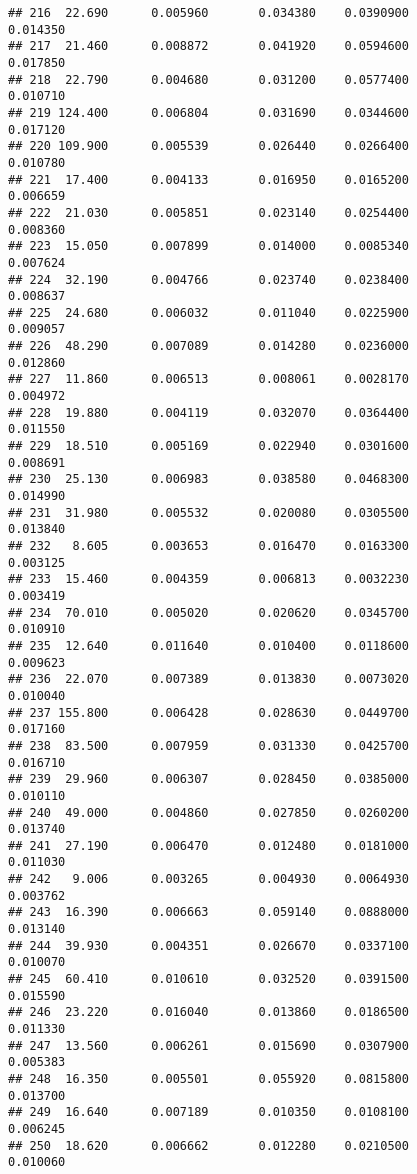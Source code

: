 \documentclass[
]{article}
\begin{document}
\begin{verbatim}
## 216  22.690      0.005960       0.034380    0.0390900          0.014350
## 217  21.460      0.008872       0.041920    0.0594600          0.017850
## 218  22.790      0.004680       0.031200    0.0577400          0.010710
## 219 124.400      0.006804       0.031690    0.0344600          0.017120
## 220 109.900      0.005539       0.026440    0.0266400          0.010780
## 221  17.400      0.004133       0.016950    0.0165200          0.006659
## 222  21.030      0.005851       0.023140    0.0254400          0.008360
## 223  15.050      0.007899       0.014000    0.0085340          0.007624
## 224  32.190      0.004766       0.023740    0.0238400          0.008637
## 225  24.680      0.006032       0.011040    0.0225900          0.009057
## 226  48.290      0.007089       0.014280    0.0236000          0.012860
## 227  11.860      0.006513       0.008061    0.0028170          0.004972
## 228  19.880      0.004119       0.032070    0.0364400          0.011550
## 229  18.510      0.005169       0.022940    0.0301600          0.008691
## 230  25.130      0.006983       0.038580    0.0468300          0.014990
## 231  31.980      0.005532       0.020080    0.0305500          0.013840
## 232   8.605      0.003653       0.016470    0.0163300          0.003125
## 233  15.460      0.004359       0.006813    0.0032230          0.003419
## 234  70.010      0.005020       0.020620    0.0345700          0.010910
## 235  12.640      0.011640       0.010400    0.0118600          0.009623
## 236  22.070      0.007389       0.013830    0.0073020          0.010040
## 237 155.800      0.006428       0.028630    0.0449700          0.017160
## 238  83.500      0.007959       0.031330    0.0425700          0.016710
## 239  29.960      0.006307       0.028450    0.0385000          0.010110
## 240  49.000      0.004860       0.027850    0.0260200          0.013740
## 241  27.190      0.006470       0.012480    0.0181000          0.011030
## 242   9.006      0.003265       0.004930    0.0064930          0.003762
## 243  16.390      0.006663       0.059140    0.0888000          0.013140
## 244  39.930      0.004351       0.026670    0.0337100          0.010070
## 245  60.410      0.010610       0.032520    0.0391500          0.015590
## 246  23.220      0.016040       0.013860    0.0186500          0.011330
## 247  13.560      0.006261       0.015690    0.0307900          0.005383
## 248  16.350      0.005501       0.055920    0.0815800          0.013700
## 249  16.640      0.007189       0.010350    0.0108100          0.006245
## 250  18.620      0.006662       0.012280    0.0210500          0.010060

\end{verbatim}
\end{document}

